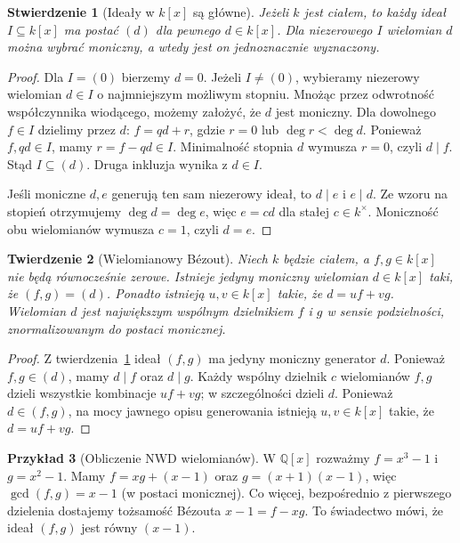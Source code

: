 \documentclass[11pt,a4paper,openany]{report}
\numberwithin{equation}{section}
\theoremstyle{plain}
\newtheorem{twierdzenie}{Twierdzenie}[section]
\newtheorem{stwierdzenie}[twierdzenie]{Stwierdzenie}
\theoremstyle{definition}
\newtheorem{przyklad}[twierdzenie]{Przykład}
\theoremstyle{remark}
\newcommand{\Q}{\mathbb Q}
\begin{document}
\begin{stwierdzenie}[Ideały w {$k[x]$} są główne]
\label{st:kx-glowne}
Jeżeli $k$ jest ciałem, to każdy ideał $I\subseteq k[x]$
ma postać $(d)$ dla pewnego $d\in k[x]$.
Dla niezerowego $I$ wielomian $d$ można wybrać moniczny,
a wtedy jest on jednoznacznie wyznaczony.
\end{stwierdzenie}
\begin{proof}
Dla $I=(0)$ bierzemy $d=0$.
Jeżeli $I\ne(0)$, wybieramy niezerowy wielomian $d\in I$
o najmniejszym możliwym stopniu. Mnożąc przez odwrotność
współczynnika wiodącego, możemy założyć, że $d$ jest moniczny.
Dla dowolnego $f\in I$ dzielimy przez $d$:
$f=qd+r$, gdzie $r=0$ lub $\deg r<\deg d$.
Ponieważ $f,qd\in I$, mamy $r=f-qd\in I$.
Minimalność stopnia $d$ wymusza $r=0$, czyli $d\mid f$.
Stąd $I\subseteq(d)$. Druga inkluzja wynika z $d\in I$.

Jeśli moniczne $d,e$ generują ten sam niezerowy ideał,
to $d\mid e$ i $e\mid d$. Ze wzoru na stopień otrzymujemy
$\deg d=\deg e$, więc $e=cd$ dla stałej $c\in k^\times$.
Moniczność obu wielomianów wymusza $c=1$, czyli $d=e$.
\end{proof}

\begin{twierdzenie}[Wielomianowy Bézout]
\label{tw:bezout-pol}
Niech $k$ będzie ciałem, a $f,g\in k[x]$ nie będą równocześnie zerowe.
Istnieje jedyny moniczny wielomian $d\in k[x]$ taki, że
$(f,g)=(d)$. Ponadto istnieją $u,v\in k[x]$ takie, że
$d=uf+vg$. Wielomian $d$ jest największym wspólnym dzielnikiem
$f$ i $g$ w sensie podzielności, znormalizowanym do postaci monicznej.
\end{twierdzenie}
\begin{proof}
Z twierdzenia~\ref{st:kx-glowne} ideał $(f,g)$ ma jedyny moniczny
generator $d$. Ponieważ $f,g\in(d)$, mamy $d\mid f$ oraz $d\mid g$.
Każdy wspólny dzielnik $c$ wielomianów $f,g$ dzieli wszystkie
kombinacje $uf+vg$; w szczególności dzieli $d$.
Ponieważ $d\in(f,g)$, na mocy jawnego opisu generowania
istnieją $u,v\in k[x]$ takie, że $d=uf+vg$.
\end{proof}

\begin{przyklad}[Obliczenie NWD wielomianów]
W $\Q[x]$ rozważmy $f=x^3-1$ i $g=x^2-1$.
Mamy $f=xg+(x-1)$ oraz $g=(x+1)(x-1)$,
więc $\gcd(f,g)=x-1$ (w postaci monicznej).
Co więcej, bezpośrednio z pierwszego dzielenia dostajemy
tożsamość Bézouta $x-1=f-xg$.
To świadectwo mówi, że ideał $(f,g)$ jest równy $(x-1)$.
\end{przyklad}
\end{document}
